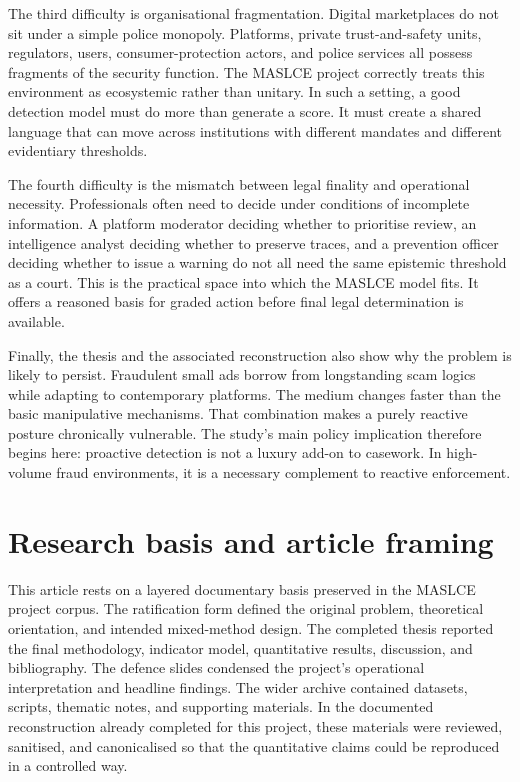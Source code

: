 \documentclass[11pt,a4paper]{article}
\begin{document}
The third difficulty is organisational fragmentation. Digital marketplaces do not sit under a simple police monopoly. Platforms, private trust-and-safety units, regulators, users, consumer-protection actors, and police services all possess fragments of the security function. The MASLCE project correctly treats this environment as ecosystemic rather than unitary. In such a setting, a good detection model must do more than generate a score. It must create a shared language that can move across institutions with different mandates and different evidentiary thresholds.

The fourth difficulty is the mismatch between legal finality and operational necessity. Professionals often need to decide under conditions of incomplete information. A platform moderator deciding whether to prioritise review, an intelligence analyst deciding whether to preserve traces, and a prevention officer deciding whether to issue a warning do not all need the same epistemic threshold as a court. This is the practical space into which the MASLCE model fits. It offers a reasoned basis for graded action before final legal determination is available.

Finally, the thesis and the associated reconstruction also show why the problem is likely to persist. Fraudulent small ads borrow from longstanding scam logics while adapting to contemporary platforms. The medium changes faster than the basic manipulative mechanisms. That combination makes a purely reactive posture chronically vulnerable. The study's main policy implication therefore begins here: proactive detection is not a luxury add-on to casework. In high-volume fraud environments, it is a necessary complement to reactive enforcement.

\section{Research basis and article framing}
This article rests on a layered documentary basis preserved in the MASLCE project corpus. The ratification form defined the original problem, theoretical orientation, and intended mixed-method design. The completed thesis reported the final methodology, indicator model, quantitative results, discussion, and bibliography. The defence slides condensed the project's operational interpretation and headline findings. The wider archive contained datasets, scripts, thematic notes, and supporting materials. In the documented reconstruction already completed for this project, these materials were reviewed, sanitised, and canonicalised so that the quantitative claims could be reproduced in a controlled way.
\end{document}
